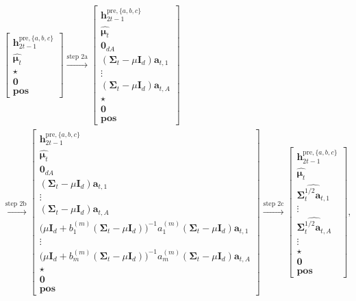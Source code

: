 \documentclass[10pt]{article}
\newcommand{\id}{\bI}
\newcommand{\<}{\left\langle}
\renewcommand{\>}{\right\rangle}
\newcommand{\bzero}{{\mathbf 0}}
\newcommand{\pre}{{\mathrm{pre}}}
\newcommand{\posv}{{\mathbf{pos}}}
\newcommand{\parta}{{a}}
\newcommand{\partb}{{b}}
\newcommand{\partc}{{c}}
\newcommand{\Tpsmean}{{{\mathbf\mu}}}
\newcommand{\Tpscov}{{{\mathbf\Sigma}}}
\newcommand{\prodeig}{{\mu}}
\def\bI{{\mathbf I}}
\def\ba{{\mathbf a}}
\def\bh{{\mathbf h}}
\begin{document}
\begin{align}
   &~\begin{bmatrix}
    \bh_{2t-1}^{\pre,\{\parta,\partb,\partc\}} \\
        \widehat{\Tpsmean_t}\\ \star\\ \bzero \\\posv
\end{bmatrix}
\xrightarrow{\text{step 2a}}
   \begin{bmatrix}
    \bh_{2t-1}^{\pre,\{\parta,\partb,\partc\}}\\\widehat{\Tpsmean_t}
        \\\bzero_{dA}\\
{(\Tpscov_t-\prodeig\id_d)\ba_{t,1}}
\\\vdots\\
        {(\Tpscov_t-\prodeig\id_d)\ba_{t,A}}\\
        \star\\ \bzero \\\posv
\end{bmatrix}\nonumber
\\ &~\xrightarrow{\text{step 2b}}
     \begin{bmatrix}
    \bh_{2t-1}^{\pre,\{\parta,\partb,\partc\}}\\\widehat{\Tpsmean_t}
        \\\bzero_{dA}\\
{(\Tpscov_t-\prodeig\id_d)\ba_{t,1}}
\\\vdots\\
       {(\Tpscov_t-\prodeig\id_d)\ba_{t,A}}
        \\
        \Big({\prodeig}\id_d+{b_1^{(m)}(\Tpscov_t-\prodeig \id_d)}\Big)^{-1}{a_1^{(m)}(\Tpscov_t-\prodeig \id_d)\ba_{t,1}}\\
        \vdots
        \\
          \Big({\prodeig}\id_d+{b_m^{(m)}(\Tpscov_t-\prodeig \id_d)}\Big)^{-1}{a_m^{(m)}(\Tpscov_t-\prodeig \id_d)\ba_{t,A}}
          \\\star\\ \bzero \\\posv
\end{bmatrix}
\xrightarrow{\text{step 2c}}
   \begin{bmatrix}
    \bh_{2t-1}^{\pre,\{\parta,\partb,\partc\}}\\\widehat{\Tpsmean_t}
        \\
\widehat{\Tpscov_t^{1/2}\ba_{t,1}}
\\\vdots\\
         \widehat{\Tpscov_t^{1/2}\ba_{t,A}}\\\vdots\\
        \star\\ \bzero \\\posv
\end{bmatrix}\label{eq:roadmap_ts_step2},
\end{align}
\end{document}
